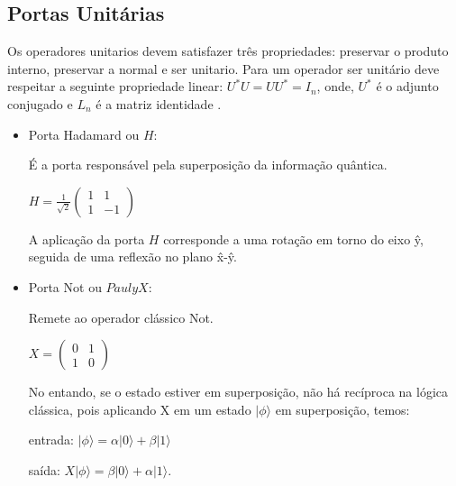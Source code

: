 \documentclass[tcc,capa]{texufpel}
\begin{document}
\subsection{Portas Unitárias}
Os operadores unitarios devem satisfazer três propriedades: preservar o produto
interno, preservar a normal e ser unitario. Para um operador ser unitário deve respeitar a seguinte propriedade linear: $U^*U=U U^*= I_n$, onde, $U^*$ é o adjunto conjugado e $L_n$ é a matriz identidade \cite{chuang00a}.

\begin{itemize}

   
  \item \begin{center}Porta Hadamard ou $H$: \cite{chuang00a}
  \end{center}  
  
    É a porta responsável pela superposição da informação quântica.
    
   
      \begin{center}  $ H = \frac{1}{\sqrt{2}}\left( \begin{array}{cc}
            1 & 1  \\
            1 & -1
        \end{array}\right)  $
  \end{center}
  
   A aplicação da porta $H$ corresponde a uma rotação em torno do eixo \^{y}, seguida de uma reflexão no plano \^{x}-\^{y}. 
   
    \item \begin{center} 
    Porta Not ou $Pauly X$:\cite{chuang00a}
    \end{center}
    Remete ao operador clássico Not.
    
    \begin{center} 
    $X= \left( \begin{array}{cc}
        0 & 1 \\
        1 & 0
    \end{array}
    \right) $
    \end{center}
    No entando, se o estado estiver em superposição, não há recíproca na lógica clássica, pois aplicando X em um estado $|\phi\rangle$ em superposição, temos:
    
   \begin{center} 
   
    entrada: $|\phi\rangle= \alpha|0\rangle + \beta|1\rangle$
    
    saída: $X|\phi\rangle= \beta|0\rangle + \alpha|1\rangle$.
    \end{center}
    

\end{itemize}
\end{document}
